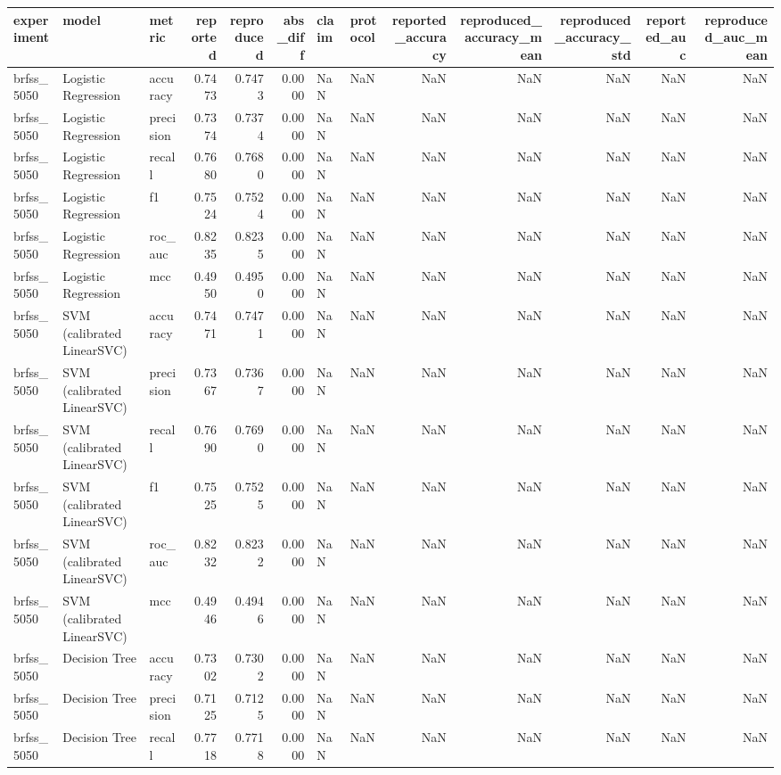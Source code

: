 \begin{tabular}{lllrrrllrrrrr}
\toprule
experiment & model & metric & reported & reproduced & abs\_diff & claim & protocol & reported\_accuracy & reproduced\_accuracy\_mean & reproduced\_accuracy\_std & reported\_auc & reproduced\_auc\_mean \\
\midrule
brfss\_5050 & Logistic Regression & accuracy & 0.7473 & 0.7473 & 0.0000 & NaN & NaN & NaN & NaN & NaN & NaN & NaN \\
brfss\_5050 & Logistic Regression & precision & 0.7374 & 0.7374 & 0.0000 & NaN & NaN & NaN & NaN & NaN & NaN & NaN \\
brfss\_5050 & Logistic Regression & recall & 0.7680 & 0.7680 & 0.0000 & NaN & NaN & NaN & NaN & NaN & NaN & NaN \\
brfss\_5050 & Logistic Regression & f1 & 0.7524 & 0.7524 & 0.0000 & NaN & NaN & NaN & NaN & NaN & NaN & NaN \\
brfss\_5050 & Logistic Regression & roc\_auc & 0.8235 & 0.8235 & 0.0000 & NaN & NaN & NaN & NaN & NaN & NaN & NaN \\
brfss\_5050 & Logistic Regression & mcc & 0.4950 & 0.4950 & 0.0000 & NaN & NaN & NaN & NaN & NaN & NaN & NaN \\
brfss\_5050 & SVM (calibrated LinearSVC) & accuracy & 0.7471 & 0.7471 & 0.0000 & NaN & NaN & NaN & NaN & NaN & NaN & NaN \\
brfss\_5050 & SVM (calibrated LinearSVC) & precision & 0.7367 & 0.7367 & 0.0000 & NaN & NaN & NaN & NaN & NaN & NaN & NaN \\
brfss\_5050 & SVM (calibrated LinearSVC) & recall & 0.7690 & 0.7690 & 0.0000 & NaN & NaN & NaN & NaN & NaN & NaN & NaN \\
brfss\_5050 & SVM (calibrated LinearSVC) & f1 & 0.7525 & 0.7525 & 0.0000 & NaN & NaN & NaN & NaN & NaN & NaN & NaN \\
brfss\_5050 & SVM (calibrated LinearSVC) & roc\_auc & 0.8232 & 0.8232 & 0.0000 & NaN & NaN & NaN & NaN & NaN & NaN & NaN \\
brfss\_5050 & SVM (calibrated LinearSVC) & mcc & 0.4946 & 0.4946 & 0.0000 & NaN & NaN & NaN & NaN & NaN & NaN & NaN \\
brfss\_5050 & Decision Tree & accuracy & 0.7302 & 0.7302 & 0.0000 & NaN & NaN & NaN & NaN & NaN & NaN & NaN \\
brfss\_5050 & Decision Tree & precision & 0.7125 & 0.7125 & 0.0000 & NaN & NaN & NaN & NaN & NaN & NaN & NaN \\
brfss\_5050 & Decision Tree & recall & 0.7718 & 0.7718 & 0.0000 & NaN & NaN & NaN & NaN & NaN & NaN & NaN \\

\end{tabular}
